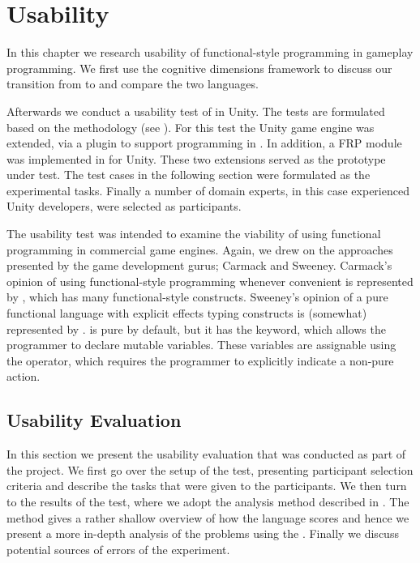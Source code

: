 \chapter{Usability}
In this chapter we research usability of functional-style programming in gameplay programming. We first use the cognitive dimensions framework to discuss our transition from \cs to \fs and compare the two languages.

Afterwards we conduct a usability test of \fs in Unity. The tests are formulated based on the \champagne methodology (see ). For this test the Unity game engine was extended, via a plugin to support programming in \fs\cite{fsharp2019plugin}. In addition, a \gls{FRP} module was implemented in \fs for Unity. These two extensions served as the prototype under test. The test cases in the following section were formulated as the experimental tasks. Finally a number of domain experts, in this case experienced Unity developers, were selected as participants.

The usability test was intended to examine the viability of using functional programming in commercial game engines. Again, we drew on the approaches presented by the game development gurus; Carmack and Sweeney. Carmack's opinion of using functional-style programming whenever convenient is represented by \cs, which has many functional-style constructs. Sweeney's opinion of a pure functional language with explicit effects typing constructs is (somewhat) represented by \fs. \fs is pure by default, but it has the  keyword, which allows the programmer to declare mutable variables. These variables are assignable using the \ttt{\textless-} operator, which requires the programmer to explicitly indicate a non-pure action.


\section{Usability Evaluation}
In this section we present the usability evaluation that was conducted as part of the project. We first go over the setup of the test, presenting participant selection criteria and describe the tasks that were given to the participants. We then turn to the results of the test, where we adopt the analysis method described in \champagne\cite{blackwell2004champagne}. The \champagne method gives a rather shallow overview of how the language scores and hence we present a more in-depth analysis of the problems using the \cognitive. Finally we discuss potential sources of errors of the experiment.




